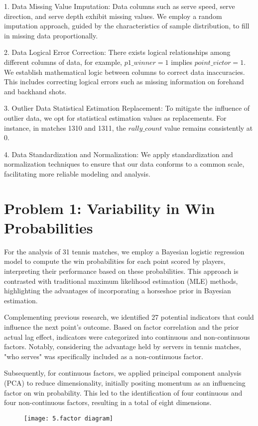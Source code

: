 \documentclass{mcmthesis}
\begin{document}
1. Data Missing Value Imputation:
Data columns such as serve speed, serve direction, and serve depth exhibit missing values. We employ a random imputation approach, guided by the characteristics of sample distribution, to fill in missing data proportionally.

2. Data Logical Error Correction:
There exists logical relationships among different columns of data, for example, $p1\_winner = 1$ implies $point\_victor = 1$. We establish mathematical logic between columns to correct data inaccuracies. This includes correcting logical errors such as missing information on forehand and backhand shots.

3. Outlier Data Statistical Estimation Replacement: To mitigate the influence of outlier data, we opt for statistical estimation values as replacements. For instance, in matches 1310 and 1311, the $rally\_count$ value remains consistently at 0.

4. Data Standardization and Normalization: We apply standardization and normalization techniques to ensure that our data conforms to a common scale, facilitating more reliable modeling and analysis.


\section{Problem 1: Variability in Win Probabilities}

For the analysis of 31 tennis matches, we employ a Bayesian logistic regression model to compute the win probabilities for each point scored by players, interpreting their performance based on these probabilities. This approach is contrasted with traditional maximum likelihood estimation (MLE) methods, highlighting the advantages of incorporating a horseshoe prior in Bayesian estimation.

Complementing previous research, we identified 27 potential indicators that could influence the next point's outcome. Based on factor correlation and the prior actual lag effect, indicators were categorized into continuous and non-continuous factors. Notably, considering the advantage held by servers in tennis matches, "who serves" was specifically included as a non-continuous factor.

Subsequently, for continuous factors, we applied principal component analysis (PCA) to reduce dimensionality, initially positing momentum as an influencing factor on win probability. This led to the identification of four continuous and four non-continuous factors, resulting in a total of eight dimensions.
\begin{figure}[ht]
  \small
  \centering
  \texttt{[image: 5.factor diagram]}
\end{figure}
\end{document}
